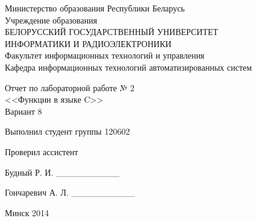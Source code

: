 \thispagestyle{empty}
\setlength{\parindent}{0ex} %

\begin{center}
  Министерство образования Республики Беларусь \\
  \smallskip
  Учреждение образования \\
  БЕЛОРУССКИЙ ГОСУДАРСТВЕННЫЙ УНИВЕРСИТЕТ \\
  ИНФОРМАТИКИ И РАДИОЭЛЕКТРОНИКИ \\
  \smallskip
  Факультет информационных технологий и управления \\
  \smallskip
  Кафедра информационных технологий автоматизированных систем
\end{center}

\vspace{50mm}

\begin{center}
  Отчет по лабораторной работе № 2 \\
  <<Функции в языке C>> \\
  Вариант 8
\end{center}

\vspace{40mm}

\begin{minipage}{.55\linewidth}
    Выполнил студент группы 120602

    \smallskip

    Проверил ассистент
\end{minipage}
\hfill
\begin{minipage}{.4\linewidth}
  \begin{flushright}
    Будный Р. И. \_\_\_\_\_\_\_\_\_\_

    \smallskip

    Гончаревич А. Л. \_\_\_\_\_\_\_\_\_\_
  \end{flushright}
\end{minipage}

\vspace{60mm}

\begin{center}
  Минск 2014
\end{center}

\setlength{\parindent}{5ex} %
